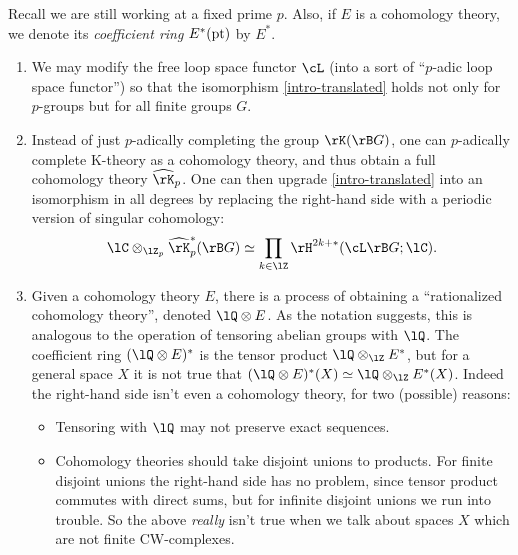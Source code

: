 \begin{nothing}
  \label{intro-genpath}
  Recall we are still working at a fixed prime $p$. Also, if $E$ is a
  cohomology theory, we denote its \emph{coefficient ring} $E^*(\mathrm{pt})$
  by $E^*$.
  \begin{enumerate}[leftmargin=*]
  \item We may modify the free loop space functor $\cL$ (into a sort
    of ``$p$-adic loop space functor'') so that the isomorphism
    \cref{intro-translated} holds not only for $p$-groups but for all
    finite groups $G$.

  \item Instead of just $p$-adically completing the group
    $\rK(\rB G)$, one can $p$-adically complete K-theory as a
    cohomology theory, and thus obtain a full cohomology theory
    $\hat\rK_p$. One can then upgrade \cref{intro-translated} into an
    isomorphism in all degrees by replacing the right-hand side with a
    periodic version of singular cohomology:
    \begin{equation}
      \label{intro-gen-alldeg}
      \lC \otimes_{\lZ_p} \hat\rK_p^*(\rB G) \iso
      \prod_{k \in \lZ} \rH^{2k+*}(\cL\rB G;\lC).
    \end{equation}

  \item Given a cohomology theory $E$, there is a process of obtaining
    a ``rationalized cohomology theory'', denoted $\lQ \otimes E$. As
    the notation suggests, this is analogous to the operation of
    tensoring abelian groups with $\lQ$. The coefficient ring
    $(\lQ \otimes E)^*$ is the tensor product $\lQ \otimes_\lZ E^*$,
    but for a general space $X$ it is not true that
    $(\lQ \otimes E)^*(X) \iso \lQ \otimes_\lZ E^*(X)$. Indeed the
    right-hand side isn't even a cohomology theory, for two (possible)
    reasons:
    \begin{itemize}
    \item Tensoring with $\lQ$ may not preserve exact sequences.
    \item Cohomology theories should take disjoint unions to
      products. For finite disjoint unions the right-hand side has no
      problem, since tensor product commutes with direct sums, but for
      infinite disjoint unions we run into trouble. So the above
      \emph{really} isn't true when we talk about spaces $X$ which are
      not finite CW-complexes.
    \end{itemize}


\end{enumerate}
\end{nothing}
